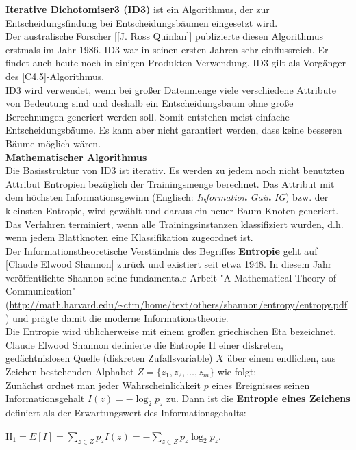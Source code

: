 \documentclass[12pt]{article}
\begin{document}
\textbf{Iterative Dichotomiser3 (ID3)} ist ein Algorithmus, der zur Entscheidungsfindung bei Entscheidungsbäumen eingesetzt wird.\\
Der australische Forscher [[J. Ross Quinlan]] publizierte diesen Algorithmus erstmals im Jahr 1986. ID3 war in seinen ersten Jahren sehr einflussreich. Er findet auch heute noch in einigen Produkten Verwendung. ID3 gilt als Vorgänger des [C4.5]-Algorithmus.\\
%
ID3 wird verwendet, wenn bei großer Datenmenge viele verschiedene Attribute von Bedeutung sind und deshalb ein Entscheidungsbaum ohne große Berechnungen generiert werden soll. Somit entstehen meist einfache Entscheidungsbäume. Es kann aber nicht garantiert werden, dass keine besseren Bäume möglich wären.\\[0.2cm]
%
\textbf{Mathematischer Algorithmus} \\[0.2cm]
Die Basisstruktur von ID3 ist iterativ. Es werden zu jedem noch nicht benutzten Attribut Entropien bezüglich der Trainingsmenge berechnet. Das Attribut mit dem höchsten Informationsgewinn (Englisch: \textit{Information Gain IG}) bzw. der kleinsten Entropie, wird gewählt und daraus ein neuer Baum-Knoten generiert.\\
Das Verfahren terminiert, wenn alle Trainingsinstanzen klassifiziert wurden, d.h. wenn jedem Blattknoten eine Klassifikation zugeordnet ist.\\[0.1cm]
Der Informationstheoretische Verständnis des Begriffes \textbf     {Entropie} geht auf [Claude Elwood Shannon] zurück und existiert seit etwa 1948. In diesem Jahr veröffentlichte Shannon seine fundamentale Arbeit "A Mathematical Theory of Communication"\\ (\url{http://math.harvard.edu/~ctm/home/text/others/shannon/entropy/entropy.pdf})
 und prägte damit die moderne Informationstheorie.\\
Die Entropie wird üblicherweise mit einem großen griechischen Eta   bezeichnet. Claude Elwood Shannon definierte die Entropie $ \mathrm{H} $ einer diskreten, gedächtnislosen Quelle (diskreten Zufallsvariable) $ X $ über einem endlichen, aus Zeichen bestehenden Alphabet $ Z=\{z_1, z_2, \dots, z_m\}$ wie folgt: \\
Zunächst ordnet man jeder Wahrscheinlichkeit $ p $ eines Ereignisses seinen Informationsgehalt $ I(z) = -\log_2 p_z $ zu. Dann ist die \textbf{Entropie eines Zeichens} definiert als der Erwartungswert des Informationsgehalts: \
\begin{center}
$ \mathrm{H_1} = E[I]= \sum_{z\in Z} p_z I(z) = - \sum_{z\in Z} p_z \log_2 p_z $.\\
\end{center}
\end{document}
